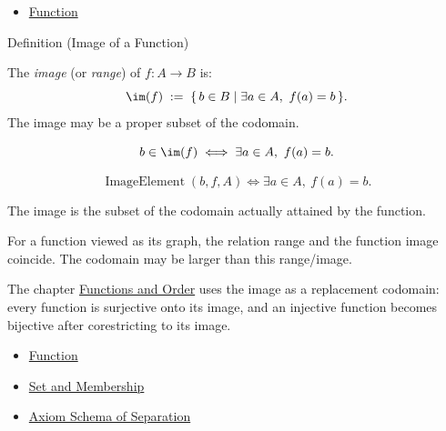 \begin{dependencies}
\begin{itemize}
  \item \hyperref[def:function]{Function}
\end{itemize}
\end{dependencies}

\begin{definitionbox}{Definition (Image of a Function)}
\begin{definition}\label{def:image-function}
The \emph{image} (or \emph{range}) of $f : A \to B$ is:
\[
\im(f) \;:=\; \{\, b \in B \mid \exists a \in A,\ f(a)=b \,\}.
\]
The image may be a proper subset of the codomain.
\end{definition}
\end{definitionbox}

\begin{remark*}
\[
  b\in\im(f)
  \iff
  \exists a\in A,\ f(a)=b.
\]
\end{remark*}

\begin{remark*}
\[
  \operatorname{ImageElement}(b,f,A)
  \iff
  \exists a\in A,\ f(a)=b.
\]
\end{remark*}

\begin{remark*}[Interpretation]
The image is the subset of the codomain actually attained by the function.
\end{remark*}

\begin{remark*}[Exposition]
For a function viewed as its graph, the relation range and the function image
coincide. The codomain may be larger than this range/image.
\end{remark*}

\begin{remark*}[Exposition]
The chapter \hyperref[ch:functions-and-order]{Functions and Order} uses the
image as a replacement codomain: every function is surjective onto its image,
and an injective function becomes bijective after corestricting to its image.
\end{remark*}

\begin{dependencies}
\begin{itemize}
  \item \hyperref[def:function]{Function}
  \item \hyperref[def:set-membership]{Set and Membership}
  \item \hyperref[ax:separation]{Axiom Schema of Separation}
\end{itemize}
\end{dependencies}


